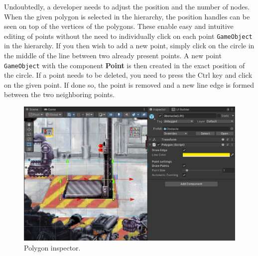 Undoubtedly, a developer needs to adjust the position and the number of nodes. When the given polygon is selected in the hierarchy, the position handles can be seen on top of the vertices of the polygons. These enable easy and intuitive editing of points without the need to individually click on each point \verb|GameObject| in the hierarchy. If you then wish to add a new point, simply click on the circle in the middle of the line between two already present points. A new point \verb|GameObject| with the component \textbf{Point} is then created in the exact position of the circle. If a point needs to be deleted, you need to press the Ctrl key and click on the given point. If done so, the point is removed and a new line edge is formed between the two neighboring points.
\begin{figure}[H]
\centering
\includegraphics[width=1\linewidth]{img/User doc/polygon.png}
\caption{Polygon inspector.}
\label{fig:Manual-Polygon}
\end{figure}

